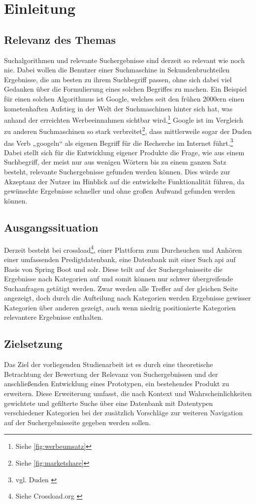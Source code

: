 \chapter{Einleitung}\label{ch:intro}

\section{Relevanz des Themas}
Suchalgorithmen und relevante Suchergebnisse sind derzeit so relevant wie noch nie.
Dabei wollen die Benutzer einer Suchmaschine in Sekundenbruchteilen Ergebnisse, die am besten zu ihrem Suchbegriff passen, ohne sich dabei viel Gedanken über die Formulierung eines solchen Begriffes zu machen.
Ein Beispiel für einen solchen Algorithmus ist Google, welches seit den frühen 2000ern einen kometenhaften Aufstieg in der Welt der Suchmaschinen hinter sich hat, was anhand der erreichten Werbeeinnahmen sichtbar wird.\footnote{Siehe \ref{fig:werbeumsatz}}
Google ist im Vergleich zu anderen Suchmaschinen so stark verbreitet\footnote{Siehe \ref{fig:marketshare}}, dass mittlerweile sogar der Duden das Verb „googeln“ als eigenen Begriff für die Recherche im Internet führt.\footnote{vgl. Duden \cite{dudenWorterbuchGooglen2022}}
Dabei stellt sich für die Entwicklung eigener Produkte die Frage, wie aus einem Suchbegriff, der meist nur aus wenigen Wörtern bis zu einem ganzen Satz besteht, relevante Suchergebnisse gefunden werden können. Dies würde zur Akzeptanz der Nutzer im Hinblick auf die entwickelte Funktionalität führen, da gewünschte Ergebnisse schneller und ohne großen Aufwand gefunden werden können.

\section{Ausgangssituation}
Derzeit besteht bei \gls{crossload}\footnote{Siehe Crossload.org \cite{crossload.orgCROSSLOAD}}, einer Plattform zum Durchsuchen und Anhören einer umfassenden Predigtdatenbank, eine Datenbank mit einer Such \gls{api} auf Basis von Spring Boot und \gls{solr}. Diese teilt auf der Suchergebnisseite die Ergebnisse nach Kategorien auf und somit können nur schwer übergreifende Suchanfragen getätigt werden. Zwar werden alle Treffer auf der gleichen Seite angezeigt, doch durch die Aufteilung nach Kategorien werden Ergebnisse gewisser Kategorien über anderen gezeigt, auch wenn niedrig positionierte Kategorien relevantere Ergebnisse enthalten.

\section{Zielsetzung}
Das Ziel der vorliegenden Studienarbeit ist es durch eine theoretische Betrachtung der Bewertung der Relevanz von Suchergebnissen und der anschließenden Entwicklung eines Prototypen, ein bestehendes Produkt zu erweitern. Diese Erweiterung umfasst, die nach Kontext und Wahrscheinlichkeiten gewichtete und gefilterte Suche über eine Datenbank mit Datentypen verschiedener Kategorien bei der zusätzlich Vorschläge zur weiteren Navigation auf der Suchergebnisseite gegeben werden sollen.
